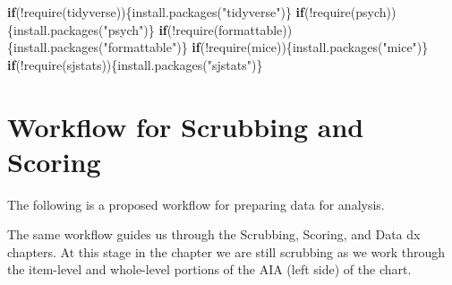 \documentclass[
  english,
]{book}
\newenvironment{Shaded}{\begin{snugshade}}{\end{snugshade}}
\newcommand{\ControlFlowTok}[1]{\textcolor[rgb]{0.13,0.29,0.53}{\textbf{#1}}}
\newcommand{\FunctionTok}[1]{\textcolor[rgb]{0.00,0.00,0.00}{#1}}
\newcommand{\NormalTok}[1]{#1}
\newcommand{\SpecialCharTok}[1]{\textcolor[rgb]{0.00,0.00,0.00}{#1}}
\newcommand{\StringTok}[1]{\textcolor[rgb]{0.31,0.60,0.02}{#1}}
\begin{document}
\begin{Shaded}
\begin{Highlighting}[]
\ControlFlowTok{if}\NormalTok{(}\SpecialCharTok{!}\FunctionTok{require}\NormalTok{(tidyverse))\{}\FunctionTok{install.packages}\NormalTok{(}\StringTok{"tidyverse"}\NormalTok{)\}}
\ControlFlowTok{if}\NormalTok{(}\SpecialCharTok{!}\FunctionTok{require}\NormalTok{(psych))\{}\FunctionTok{install.packages}\NormalTok{(}\StringTok{"psych"}\NormalTok{)\}}
\ControlFlowTok{if}\NormalTok{(}\SpecialCharTok{!}\FunctionTok{require}\NormalTok{(formattable))\{}\FunctionTok{install.packages}\NormalTok{(}\StringTok{"formattable"}\NormalTok{)\}}
\ControlFlowTok{if}\NormalTok{(}\SpecialCharTok{!}\FunctionTok{require}\NormalTok{(mice))\{}\FunctionTok{install.packages}\NormalTok{(}\StringTok{"mice"}\NormalTok{)\}}
\ControlFlowTok{if}\NormalTok{(}\SpecialCharTok{!}\FunctionTok{require}\NormalTok{(sjstats))\{}\FunctionTok{install.packages}\NormalTok{(}\StringTok{"sjstats"}\NormalTok{)\}}
\end{Highlighting}
\end{Shaded}

\hypertarget{workflow-for-scrubbing-and-scoring-1}{%
\section{Workflow for Scrubbing and Scoring}\label{workflow-for-scrubbing-and-scoring-1}}

The following is a proposed workflow for preparing data for analysis.

The same workflow guides us through the Scrubbing, Scoring, and Data dx chapters. At this stage in the chapter we are still scrubbing as we work through the item-level and whole-level portions of the AIA (left side) of the chart.
\end{document}

